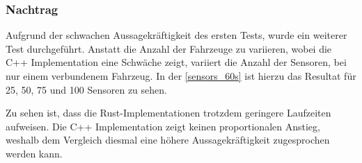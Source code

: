 \subsubsection{Nachtrag}

Aufgrund der schwachen Aussagekräftigkeit des ersten Tests, wurde ein weiterer Test durchgeführt. Anstatt die Anzahl der Fahrzeuge zu variieren, wobei die C++ Implementation eine Schwäche zeigt, variiert die Anzahl der Sensoren, bei nur einem verbundenem Fahrzeug.
In der \autoref{sensors_60s} ist hierzu das Resultat für 25, 50, 75 und 100 Sensoren zu sehen.


Zu sehen ist, dass die Rust-Implementationen trotzdem geringere Laufzeiten aufweisen.
Die C++ Implementation zeigt keinen proportionalen Anstieg, weshalb dem Vergleich diesmal eine höhere Aussagekräftigkeit zugesprochen werden kann.

